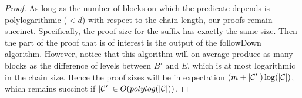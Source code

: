\begin{proof}
As long as the number of blocks on which the predicate depends is
polylogarithmic ($< d$) with respect to the chain length, our proofs remain
succinct. Specifically, the proof size for the suffix has exactly the same size.
Then the part of the proof that is of interest is the output of the
\textsf{followDown} algorithm. However, notice that this algorithm will on
average produce as many blocks as the difference of levels between $B'$ and $E$,
which is at most logarithmic in the chain size. Hence the proof sizes will be in
expectation $(m + |\mathcal{C}'|)\log(|\mathcal{C}|)$, which remains succinct if
$|\mathcal{C}'| \in O(polylog(|\mathcal{C}|))$.
\Qed
\end{proof}
